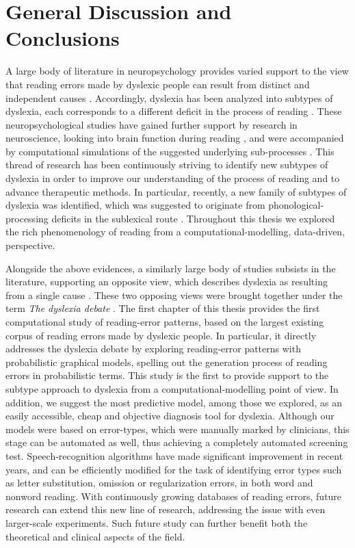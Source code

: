 \chapter*{General Discussion and Conclusions}
A large body of literature in neuropsychology provides varied support to the view that reading errors made by dyslexic people can result from distinct and independent causes \citep{mn73, sw77, c83, c96, shallice2000selective, friedmann2001letter}. Accordingly, dyslexia has been analyzed into subtypes of dyslexia, each corresponds to a different deficit in the process of reading \citep[for a review, see,  ][]{ck12}. These neuropsychological studies have gained further support by research in neuroscience, looking into brain function during reading \citep{fiebach2002fmri, joubert2004neural, levy2009testing}, and were accompanied by computational simulations of the suggested underlying sub-processes \citep{coltheart2001drc, perry2007nested}. This thread of research has been continuously striving to identify new subtypes of dyslexia in order to improve our understanding of the process of reading and to advance therapeutic methods. In particular, recently, a new family of subtypes of dyslexia was identified, which was suggested to originate from phonological-processing deficits in the sublexical route \citep{Gvion2010, Gvion2012}. Throughout this thesis we explored the rich phenomenology of reading from a computational-modelling, data-driven, perspective. 

Alongside the above evidences, a similarly large body of studies subsists in the literature, supporting an opposite view, which describes dyslexia as resulting from a single cause \citep{stanovich1988explaining, s98, s00, ss05, rrddcw03, rs08, d09, bdvsgmg13, vgpsh13, grggvfb02, r14}. These two opposing views were brought together under the term \textit{The dyslexia debate} \citep{eg14}. The first chapter of this thesis provides the first computational study of reading-error patterns, based on the largest existing corpus of reading errors made by dyslexic people. In particular, it directly addresses the dyslexia debate by exploring reading-error patterns with probabilistic graphical models, spelling out the generation process of reading errors in probabilistic terms. This study is the first to provide support to the subtype approach to dyslexia from a computational-modelling point of view. In addition, we suggest the most predictive model, among those we explored, as an easily accessible, cheap and objective diagnosis tool for dyslexia. Although our models were based on error-types, which were manually marked by clinicians, this stage can be automated as well, thus achieving a completely automated screening test. Speech-recognition algorithms have made significant improvement in recent years, and can be efficiently modified for the task of identifying error types such as letter substitution, omission or regularization errors, in both word and nonword reading. With continuously growing databases of reading errors, future research can extend this new line of research, addressing the issue with even larger-scale experiments. Such future study can further benefit both the theoretical and clinical aspects of the field. 

